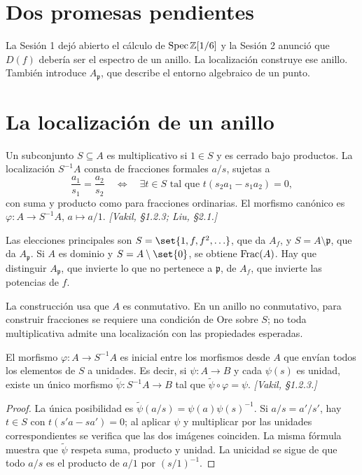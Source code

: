\section{Dos promesas pendientes}

La Sesión 1 dejó abierto el cálculo de $\operatorname{Spec}\mathbb Z[1/6]$ y la Sesión 2 anunció que $D(f)$ debería ser el espectro de un anillo. La localización construye ese anillo. También introduce $A_{\mathfrak p}$, que describe el entorno algebraico de un punto.

\section{La localización de un anillo}

\begin{defi}[Localización]
\label{defi:s03-localizacion}
Un subconjunto $S\subseteq A$ es multiplicativo si $1\in S$ y es cerrado bajo productos. La localización $S^{-1}A$ consta de fracciones formales $a/s$, sujetas a
\[
\frac{a_1}{s_1}=\frac{a_2}{s_2}\quad\Longleftrightarrow\quad
\exists t\in S\text{ tal que }t(s_2a_1-s_1a_2)=0,
\]
con suma y producto como para fracciones ordinarias. El morfismo canónico es $\varphi\colon A\to S^{-1}A$, $a\mapsto a/1$. \emph{[Vakil, \S1.2.3; Liu, \S2.1.]}
\end{defi}

\begin{ejem}
\label{ejem:s03-dos-sabores}
Las elecciones principales son $S=\set{1,f,f^2,\ldots}$, que da $A_f$, y $S=A\setminus\mathfrak p$, que da $A_{\mathfrak p}$. Si $A$ es dominio y $S=A\setminus\set{0}$, se obtiene $\operatorname{Frac}(A)$. Hay que distinguir $A_{\mathfrak p}$, que invierte lo que no pertenece a $\mathfrak p$, de $A_f$, que invierte las potencias de $f$.
\end{ejem}

\begin{obs}
\label{obs:s03-caso-no-conmutativo}
La construcción usa que $A$ es conmutativo. En un anillo no conmutativo, para construir fracciones se requiere una condición de Ore sobre $S$; no toda multiplicativa admite una localización con las propiedades esperadas.
\end{obs}

\begin{prop}
\label{prop:s03-propiedad-universal-localizacion}
El morfismo $\varphi\colon A\to S^{-1}A$ es inicial entre los morfismos desde $A$ que envían todos los elementos de $S$ a unidades. Es decir, si $\psi\colon A\to B$ y cada $\psi(s)$ es unidad, existe un único morfismo $\widetilde\psi\colon S^{-1}A\to B$ tal que $\widetilde\psi\circ\varphi=\psi$. \emph{[Vakil, \S1.2.3.]}
\end{prop}
\begin{proof}
La única posibilidad es $\widetilde\psi(a/s)=\psi(a)\psi(s)^{-1}$. Si $a/s=a'/s'$, hay $t\in S$ con $t(s'a-sa')=0$; al aplicar $\psi$ y multiplicar por las unidades correspondientes se verifica que las dos imágenes coinciden. La misma fórmula muestra que $\widetilde\psi$ respeta suma, producto y unidad. La unicidad se sigue de que todo $a/s$ es el producto de $a/1$ por $(s/1)^{-1}$.
\end{proof}

